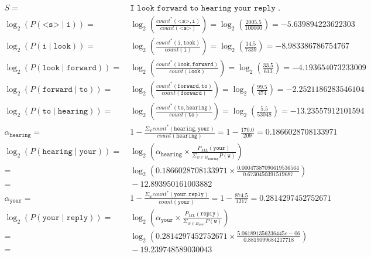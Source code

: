 \documentclass{article}
\begin{document}
\begin{equation}\begin{split}
S =&\ \texttt{I look forward to hearing your reply .} \\
\log_{2} (P(\texttt{<s>} \mid \texttt{i})) =&\  \log_{2} (\frac{count^{*}(\texttt{<s>} , \texttt{i})}{count(\texttt{<s>})}) = \log_{2} (\frac{2005.5}{100000}) = -5.639894223622303  \\
\log_{2} (P(\texttt{i} \mid \texttt{look})) =&\  \log_{2} (\frac{count^{*}(\texttt{i} , \texttt{look})}{count(\texttt{i})}) = \log_{2} (\frac{14.5}{7339}) = -8.983386786754767  \\
\log_{2} (P(\texttt{look} \mid \texttt{forward})) =&\  \log_{2} (\frac{count^{*}(\texttt{look} , \texttt{forward})}{count(\texttt{look})}) = \log_{2} (\frac{33.5}{613}) = -4.193654073233009  \\
\log_{2} (P(\texttt{forward} \mid \texttt{to})) =&\  \log_{2} (\frac{count^{*}(\texttt{forward} , \texttt{to})}{count(\texttt{forward})}) = \log_{2} (\frac{99.5}{474}) = -2.2521186283546104  \\
\log_{2} (P(\texttt{to} \mid \texttt{hearing})) =&\  \log_{2} (\frac{count^{*}(\texttt{to} , \texttt{hearing})}{count(\texttt{to})}) = \log_{2} (\frac{5.5}{53048}) = -13.23557912101594  \\
\alpha_{\texttt{hearing}} =&\  1 - \frac{\Sigma_{w} count^{*}(\texttt{hearing} , \texttt{your})}{count(\texttt{hearing})} = 1 - \frac{170.0}{209} = 0.1866028708133971  \\
\log_{2} (P(\texttt{hearing} \mid \texttt{your})) =&\  \log_{2} (\alpha_{\texttt{hearing}} \times \frac{P_{ML}(\texttt{your})}{\Sigma_{w \in B_{\texttt{hearing}}} P(\texttt{w})})  \\ =&\ \log_{2} (0.1866028708133971\times \frac{0.00047387090619536564}{0.6730450391519687})  \\ =&\ -12.893950161003882  \\
\alpha_{\texttt{your}} =&\  1 - \frac{\Sigma_{w} count^{*}(\texttt{your} , \texttt{reply})}{count(\texttt{your})} = 1 - \frac{874.5}{1217} = 0.2814297452752671  \\
\log_{2} (P(\texttt{your} \mid \texttt{reply})) =&\  \log_{2} (\alpha_{\texttt{your}} \times \frac{P_{ML}(\texttt{reply})}{\Sigma_{w \in B_{\texttt{your}}} P(\texttt{w})})  \\ =&\ \log_{2} (0.2814297452752671\times \frac{5.061891356236445e-06}{0.8819099684217718})  \\ =&\ -19.239748589030043  \\

\end{split}
\end{equation}
\end{document}
